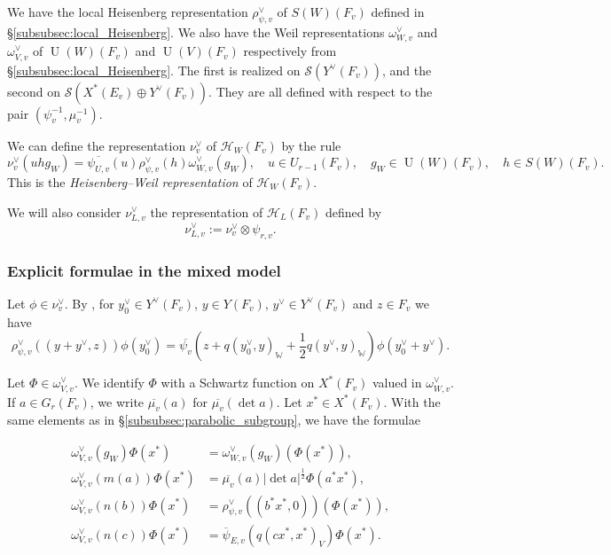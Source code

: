 \documentclass[letterpaper,11pt]{amsart}
\newcommand{\bW}{\mathbb{W}}
\newcommand{\cH}{\mathcal{H}}
\newcommand{\cS}{\mathcal{S}}
\newcommand{\<}{\negthickspace}
\newcommand{\valP}[1]{\left|#1\right|}
\DeclareMathOperator{\U}{U}
\theoremstyle{definition}
\theoremstyle{plain}
\theoremstyle{remark}
\numberwithin{equation}{section}
\begin{document}
We have the local Heisenberg representation $\rho^\vee_{\psi,v}$ of $S(W)(F_v)$ defined in \S\ref{subsubsec:local_Heisenberg}. We also have the Weil representations $\omega_{W,v}^\vee$ and $\omega_{V,v}^\vee$ of $\U(W)(F_v)$ and $\U(V)(F_v)$ respectively from \S\ref{subsubsec:local_Heisenberg}. The first is realized on $\cS(Y^\vee(F_v))$, and the second on $\cS(X^*(E_v) \oplus Y^\vee(F_v))$. They are all defined with respect to the pair $(\psi_v^{-1},\mu_v^{-1})$.

We can define the representation $\nu^\vee_v$ of $\cH_W(F_v)$ by the rule
\begin{equation}
\label{eq:nu_defi2}
    \nu^\vee_v(u h g_W)=\overline{\psi_{U,v}}(u) \rho^\vee_{\psi,v}(h) \omega^\vee_{W,v}(g_W) , \quad u \in U_{r-1}(F_v), \quad g_W \in \U(W)(F_v), \quad h \in S(W)(F_v).
\end{equation}
This is the \emph{Heisenberg--Weil representation} of $\cH_W(F_v)$.

We will also consider $\nu_{L,v}^\vee$ the representation of $\cH_L(F_v)$ defined by
    \begin{equation}
        \label{eq:nu_L}
        \nu_{L,v}^\vee:=\nu_{v}^\vee \otimes \psi_{r,v}.
    \end{equation}

\subsubsection{Explicit formulae in the mixed model} 
\label{subsubsec:explicit_Weil}

Let $\phi \in \nu^\vee_v$. By \cite{Kudla}, for $y^\vee_0 \in Y^\vee(F_v)$, $y \in Y(F_v)$, $y^\vee \in Y^\vee(F_v)$ and $z \in F_v$ we have
    \begin{equation}
        \label{eq:Heisenberg_action}
        \rho_{\psi,v}^\vee((y+y^\vee,z))\phi(y_0^\vee)=\overline{\psi_v}\left(z+q(y_0^\vee,y) _{\bW}+\frac{1}{2}q(y^\vee,y )_{\bW}\right)\phi(y_0^\vee+y^\vee).
    \end{equation}

Let $\Phi \in \omega_{V,v}^\vee$. We identify $\Phi$ with a Schwartz function on $X^*(F_v)$ valued in $\omega_{W,v}^\vee$. If $a \in G_r(F_v)$, we write $\overline{\mu_v}(a)$ for $\overline{\mu_v}(\det a)$. Let $x^* \in X^*(F_v)$. With the same elements as in \S\ref{subsubsec:parabolic_subgroup}, we have the formulae

    \begin{align}
    \omega_{V,v}^\vee(g_W)\Phi(x^*) &= \omega_{W,v}^\vee(g_W)(\Phi(x^*)) \label{eq:weil_formula_P1},\\
    \omega^\vee_{V,v}(m(a)) \Phi(x^*) & = \overline{\mu_v}(a) \valP{\det a}^{\frac{1}{2}}
    \Phi(a^* x^*) \label{eq:weil_formula_P2},\\
    \omega^\vee_{V,v}(n(b))\Phi(x^*) &= \rho_{\psi,v}^\vee((b^* x^*, 0)) (\Phi(x^*)) \label{eq:weil_formula_P3} ,\\
    \omega_{V,v}^\vee(n(c))\Phi(x^*) & = \overline{\psi}_{E,v}(q(cx^*, x^* )_{V}) \Phi(x^*) \label{eq:weil_formula_P4}.
    \end{align}
    
\end{document}
